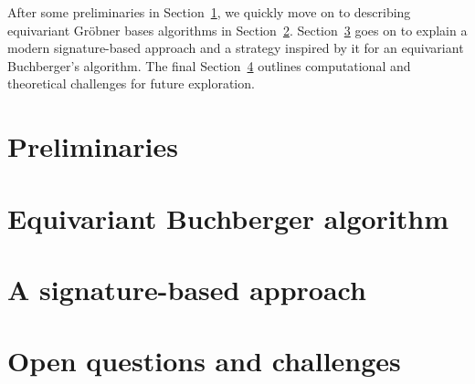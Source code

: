\documentclass[twoside,leqno]{article}
\begin{document}
After some preliminaries in Section~\ref{prelim}, we quickly move on to describing equivariant Gr\"obner bases algorithms in Section~\ref{EGB}.  Section~\ref{sec:signature} goes on to explain a modern signature-based approach and a strategy inspired by it for an equivariant Buchberger's algorithm. The final Section~\ref{sec:challenges} outlines computational and theoretical challenges for future exploration.

\section{Preliminaries}\label{prelim}



\section{Equivariant Buchberger algorithm}\label{EGB}



\section{A signature-based approach}\label{sec:signature}



\section{Open questions and challenges}\label{sec:challenges}





\end{document}
